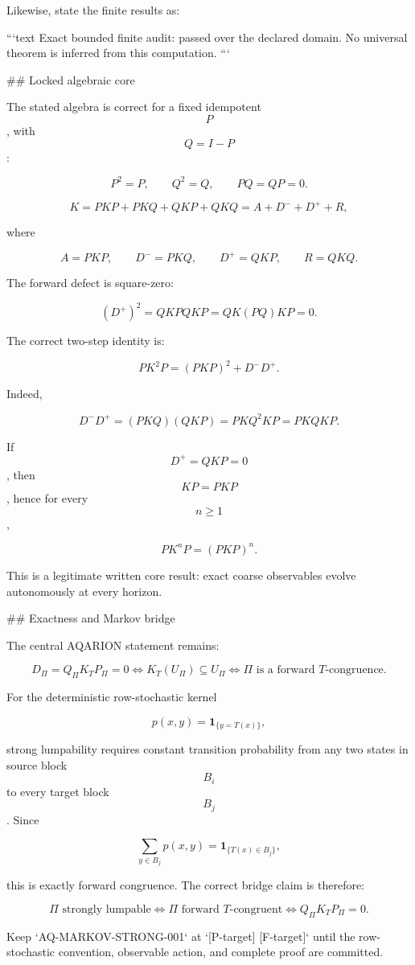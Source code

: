 Likewise, state the finite results as:

```text
Exact bounded finite audit: passed over the declared domain.
No universal theorem is inferred from this computation.
```

## Locked algebraic core

The stated algebra is correct for a fixed idempotent $$P$$, with $$Q=I-P$$:

$$
P^2=P,\qquad Q^2=Q,\qquad PQ=QP=0.
$$

$$
K=PKP+PKQ+QKP+QKQ
=
A+D^-+D^++R,
$$

where

$$
A=PKP,\qquad D^-=PKQ,\qquad D^+=QKP,\qquad R=QKQ.
$$

The forward defect is square-zero:

$$
(D^+)^2
=
QKPQKP
=
QK(PQ)KP
=
0.
$$

The correct two-step identity is:

$$
\boxed{
PK^2P=(PKP)^2+D^-D^+.
}
$$

Indeed,

$$
D^-D^+
=
(PKQ)(QKP)
=
PKQ^2KP
=
PKQKP.
$$

If $$D^+=QKP=0$$, then $$KP=PKP$$, hence for every $$n\ge1$$,

$$
\boxed{
PK^nP=(PKP)^n.
}
$$

This is a legitimate written core result: exact coarse observables evolve autonomously at every horizon.

## Exactness and Markov bridge

The central AQARION statement remains:

$$
\boxed{
D_\Pi=Q_\Pi K_TP_\Pi=0
\iff
K_T(U_\Pi)\subseteq U_\Pi
\iff
\Pi\text{ is a forward }T\text{-congruence}.
}
$$

For the deterministic row-stochastic kernel

$$
p(x,y)=\mathbf 1_{\{y=T(x)\}},
$$

strong lumpability requires constant transition probability from any two states in source block $$B_i$$ to every target block $$B_j$$. Since

$$
\sum_{y\in B_j}p(x,y)
=
\mathbf 1_{\{T(x)\in B_j\}},
$$

this is exactly forward congruence. The correct bridge claim is therefore:

$$
\Pi\text{ strongly lumpable}
\iff
\Pi\text{ forward }T\text{-congruent}
\iff
Q_\Pi K_TP_\Pi=0.
$$

Keep `AQ-MARKOV-STRONG-001` at `[P-target] [F-target]` until the row-stochastic convention, observable action, and complete proof are committed.

